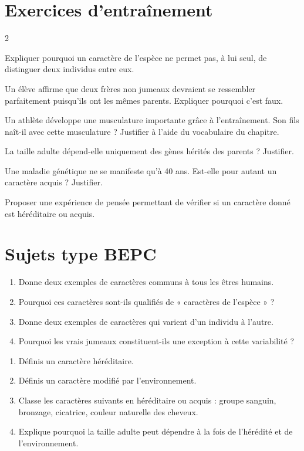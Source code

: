 \section{Exercices d'entraînement}
\begin{multicols}{2}

\exo{} Expliquer pourquoi un caractère de l'espèce ne permet pas, à lui seul,
de distinguer deux individus entre eux.

\exo{} Un élève affirme que deux frères non jumeaux devraient se ressembler
parfaitement puisqu'ils ont les mêmes parents. Expliquer pourquoi c'est faux.

\exo{} Un athlète développe une musculature importante grâce à l'entraînement.
Son fils naît-il avec cette musculature ? Justifier à l'aide du vocabulaire du
chapitre.

\exo{} La taille adulte dépend-elle uniquement des gènes hérités des parents ?
Justifier.

\exo{} Une maladie génétique ne se manifeste qu'à 40 ans. Est-elle pour autant
un caractère acquis ? Justifier.

\exo{} Proposer une expérience de pensée permettant de vérifier si un caractère
donné est héréditaire ou acquis.

\end{multicols}

\section{Sujets type BEPC}

\begin{enumerate}[label=\arabic*)]
\item Donne deux exemples de caractères communs à tous les êtres humains.
\item Pourquoi ces caractères sont-ils qualifiés de « caractères de l'espèce » ?
\item Donne deux exemples de caractères qui varient d'un individu à l'autre.
\item Pourquoi les vrais jumeaux constituent-ils une exception à cette variabilité ?
\end{enumerate}

\begin{enumerate}[label=\arabic*)]
\item Définis un caractère héréditaire.
\item Définis un caractère modifié par l'environnement.
\item Classe les caractères suivants en héréditaire ou acquis : groupe sanguin,
bronzage, cicatrice, couleur naturelle des cheveux.
\item Explique pourquoi la taille adulte peut dépendre à la fois de l'hérédité et de
l'environnement.
\end{enumerate}

